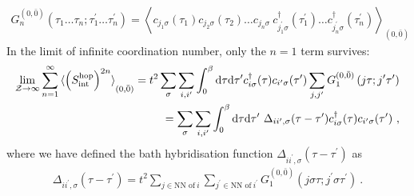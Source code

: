 \begin{equation}\begin{aligned}
	G_n^{(0,\bar 0)}\left(\tau_1\ldots \tau_n; \tau_1^\prime\ldots \tau_n^\prime\right) = \left<c_{j_1\sigma}(\tau_{1})c_{j_2\sigma}(\tau_{2})\ldots c_{j_n\sigma} ~ c^\dagger_{j_1^\prime\sigma}(\tau_{1}^\prime)\ldots c^\dagger_{j_n^\prime\sigma}(\tau_{n}^\prime) \right>_{(0,{\bar 0})} 
\end{aligned}\end{equation}
In the limit of infinite coordination number, only the \(n=1\) term survives:
\begin{equation}\begin{aligned}
	\lim_{\mathcal{Z}\to \infty}\sum_{n=1}^\infty \braket{\left(S_\text{int}^\text{hop}\right)^{2n}}_{(0,{\bar 0})} = t^2\sum_{\sigma}\sum_{i,i^\prime}\int_0^\beta\mathrm{d\tau}\mathrm{d\tau^\prime}c^\dagger_{i\sigma}(\tau)c_{i^\prime\sigma}(\tau^\prime)\sum_{j,j^\prime}G_1^{(0,\bar 0)}\left(j\tau; j^\prime\tau^\prime\right) \\
	= \sum_{\sigma}\sum_{i,i^\prime}\int_0^\beta\mathrm{d\tau}\mathrm{d\tau^\prime}~\Delta_{ii^\prime,\sigma}(\tau - \tau^\prime)c^\dagger_{i\sigma}(\tau)c_{i^\prime\sigma}(\tau^\prime)~,
\end{aligned}\end{equation}
where we have defined the bath hybridisation function \(\Delta_{ii^\prime,\sigma}(\tau - \tau^\prime)\) as
\begin{equation}\begin{aligned}
	\Delta_{ii^\prime,\sigma}(\tau - \tau^\prime) = t^2\sum_{j \in \text{NN of}~i}\sum_{j^\prime \in \text{NN of}~i^\prime}G_1^{(0,\bar 0)}\left(j\sigma\tau; j^\prime\sigma\tau^\prime\right)~.
\end{aligned}\end{equation}

